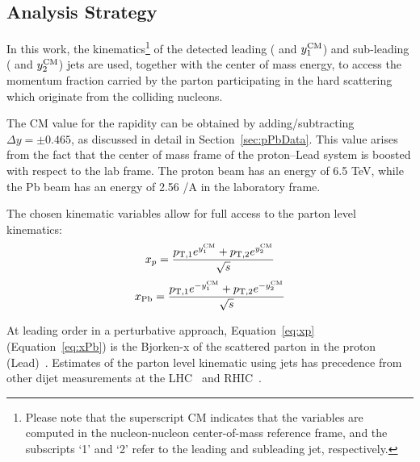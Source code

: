 \subsection{Analysis Strategy}

In this work, the kinematics\footnote{Please note that the superscript CM indicates that the variables are computed in the nucleon-nucleon center-of-mass reference frame, and the subscripts `1' and `2' refer to the leading and subleading jet, respectively.} of the detected leading ( and $y^{\text{CM}}_{1}$) and sub-leading ( and $y^{\text{CM}}_{2}$) jets are used, together with the center of mass energy, to access the momentum fraction carried by the parton participating in the hard scattering which originate from the colliding nucleons.

The CM value for the rapidity can be obtained by adding/subtracting $\Delta y = \pm 0.465$, as discussed in detail in Section~\ref{sec:pPbData}.
This value arises from the fact that the center of mass frame of the proton--Lead system is boosted with respect to the lab frame.
The proton beam has an energy of 6.5 TeV, while the Pb beam has an energy of 2.56 \TeV/A in the laboratory frame.

The chosen kinematic variables allow for full access to the parton level kinematics:
\begin{equation}
    \label{eq:xp}
    x_p =
    \frac{ p_{\text{T},1}e^{y^{\text{CM}}_{1}}
        +
    p_{\text{T},2}e^{y^{\text{CM}}_{2}}}
    {\sqrt{s}}
\end{equation}
\begin{equation}
    \label{eq:xPb}
    x_{\text{Pb}}
    =
    \frac{ p_{\text{T},1}e^{-y^{\text{CM}}_{1}}
        +
    p_{\text{T},2}e^{-y^{\text{CM}}_{2}}}
    {\sqrt{s}}
\end{equation}

At leading order in a perturbative approach, Equation~\ref{eq:xp} (Equation~\ref{eq:xPb}) is the Bjorken-x of the scattered parton in the proton (Lead)~\cite{pPb:xpapprox}.
Estimates of the parton level kinematic using jets has precedence from other dijet measurements at the LHC~\cite{HION-2015-02,HION-2022-15,HION-2024-12} and RHIC~\cite{PHENIX:dAuSupression}.

